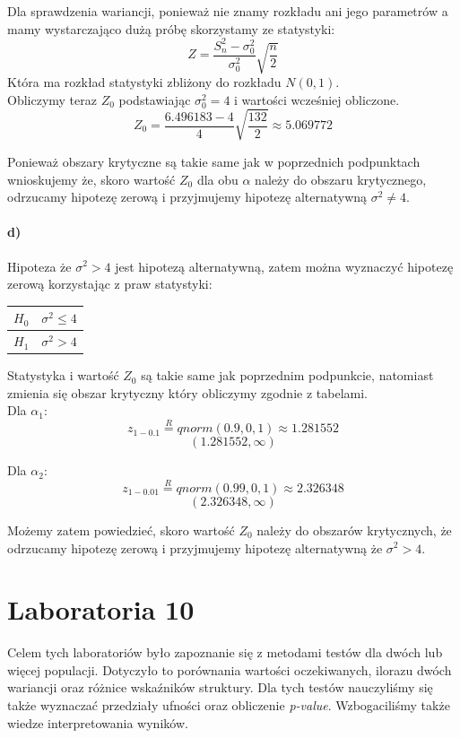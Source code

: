 \documentclass{article}
\begin{document}
Dla sprawdzenia wariancji, ponieważ nie znamy rozkładu ani jego parametrów a mamy wystarczająco dużą próbę skorzystamy ze statystyki:
\[ Z = \frac{S_n^2-\sigma_0^2}{\sigma_0^2} \sqrt{\frac{n}{2}} \]
Która ma rozkład statystyki zbliżony do rozkładu $N(0,1)$. \\
Obliczymy teraz $Z_0$ podstawiając $\sigma^2_0 = 4$ i wartości wcześniej obliczone.
\[ Z_0 = \frac{6.496183 - 4}{4} \sqrt{\frac{132}{2}} \approx 5.069772 \]

Ponieważ obszary krytyczne są takie same jak w poprzednich podpunktach wnioskujemy że, skoro wartość $Z_0$ dla obu $\alpha$ należy do obszaru krytycznego, odrzucamy hipotezę zerową i przyjmujemy hipotezę alternatywną $\sigma^2 \neq 4$.

\subsection{d)}
Hipoteza że $\sigma^2 > 4$ jest hipotezą alternatywną, zatem można wyznaczyć hipotezę zerową korzystając z praw statystyki:
\begin{center} \begin{tabular}{|c|c|} \hline
$H_0$ & $\sigma^2 \leq 4$ \\ \hline
$H_1$ & $\sigma^2 > 4$ \\ \hline
\end{tabular} \end{center}

Statystyka i wartość $Z_0$ są takie same jak poprzednim podpunkcie, natomiast zmienia się obszar krytyczny który obliczymy zgodnie z tabelami.\\
Dla $\alpha_1$:
\[z_{1 - 0.1} \overset{R}{=} qnorm(0.9, 0, 1) \approx 1.281552 \]
\[ (1.281552, \infty) \]

Dla $\alpha_2$:
\[z_{1 - 0.01} \overset{R}{=} qnorm(0.99, 0, 1) \approx 2.326348 \]
\[ (2.326348, \infty) \]

Możemy zatem powiedzieć, skoro wartość $Z_0$ należy do obszarów krytycznych, że odrzucamy hipotezę zerową i przyjmujemy hipotezę alternatywną że $\sigma^2 > 4$.

\newpage
\part{Laboratoria 10}
Celem tych laboratoriów było zapoznanie się z metodami testów dla dwóch lub więcej populacji. Dotyczyło to porównania wartości oczekiwanych, ilorazu dwóch wariancji oraz różnice wskaźników struktury. Dla tych testów nauczyliśmy się także wyznaczać przedziały ufności oraz obliczenie \textit{p-value}. Wzbogaciliśmy także wiedze interpretowania wyników.
\end{document}
